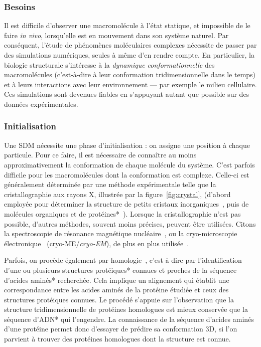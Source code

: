 	\subsubsection{Besoins} Il est difficile d'observer une macromolécule à l'état statique, et impossible de le faire \emph{in vivo}, lorsqu'elle est en mouvement dans son système naturel. Par conséquent, l'étude de phénomènes moléculaires complexes nécessite de passer par des simulations numériques, seules à même d'en rendre compte. En particulier, la biologie structurale s'intéresse à la \emph{dynamique conformationnelle} des macromolécules (c'est-à-dire à leur conformation tridimensionnelle dans le temps) et à leurs interactions avec leur environnement --- par exemple le milieu cellulaire. Ces simulations sont devenues fiables en s'appuyant autant que possible sur des données expérimentales.
	
	\subsubsection{Initialisation}
	Une SDM nécessite une phase d'initialisation : on assigne une position à chaque particule. Pour ce faire, il est nécessaire de connaître au moins approximativement la conformation de chaque molécule du système. C'est parfois difficile pour les macromolécules dont la conformation est complexe. Celle-ci est généralement déterminée par une méthode expérimentale telle que la cristallographie aux rayons X, illustrée par la figure~\ref{fig:crystal}, (d'abord employée pour déterminer la structure de petits cristaux inorganiques~\cite{friedrich1912sitzungsberichte, bragg1914reflexion, bragg1913structure, dickinson1923crystal}, puis de molécules organiques et de protéines*~\cite{de1925interpretation, crowfoot1935x, kendrew1958three}).\footnotemark{} Lorsque la cristallographie n'est pas possible, d'autres méthodes, souvent moins précises, peuvent être utilisées. Citons la spectroscopie de résonance magnétique nucléaire~\cite{clore1989determination, wuthrich1990protein, clore1991structures, wuthrich2001way}, ou la cryo-microscopie électronique~\cite{adrian1984cryo} (cryo-ME/\emph{cryo-EM}), de plus en plus utilisée~\cite{kuhlbrandt2014cryo, callaway2015revolution, dellisanti2015barrier, bartesaghi20152}.

	
	Parfois, on procède également par homologie~\cite{marti2000comparative, kaczanowski2010similar}, c'est-à-dire par l'identification d'une ou plusieurs structures protéiques* connues et proches de la séquence d'acides aminés* recherchée. Cela implique un alignement qui établit une correspondance entre les acides aminés de la protéine étudiée et ceux des structures protéiques connues. Le procédé s'appuie sur l'observation que la structure tridimensionnelle de protéines homologues est mieux conservée que la séquence d'ADN* qui l'engendre. La connaissance de la séquence d'acides aminés d'une protéine permet donc d'essayer de prédire sa conformation 3D, si l'on parvient à trouver des protéines homologues dont la structure est connue.
	
